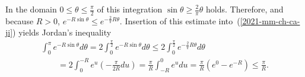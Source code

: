 In the domain $0\le \theta \le \frac{\pi}{2}$ of this integration
$\sin \theta \ge \frac{2}{\pi} \theta$ holds.
Therefore, and because $R>0$,
$e^{-R \sin \theta} \le e^{- \frac{2}{\pi}R \theta}$.
Insertion of this estimate into~(\ref{2021-mm-ch-ca-ji}) yields   Jordan's inequality
\begin{equation}
\label{2021-mm-ch-ca-jii}
\begin{split}
\int_0^\pi e^{-R \sin \theta} d\theta=
2 \int_0^\frac{\pi}{2} e^{-R \sin \theta} d\theta
\le
2 \int_0^\frac{\pi}{2}e^{- \frac{2}{\pi}R \theta} d\theta
\\ \qquad
=
2 \int_0^{-R} e^u \left( -\frac{\pi}{2R} du \right)
=
\frac{\pi}{R} \int_{-R}^0 e^u  du =  \frac{\pi}{R} \left( e^0 -e^{-R}\right)
\le  \frac{\pi}{R}
.
\end{split}
\end{equation}



